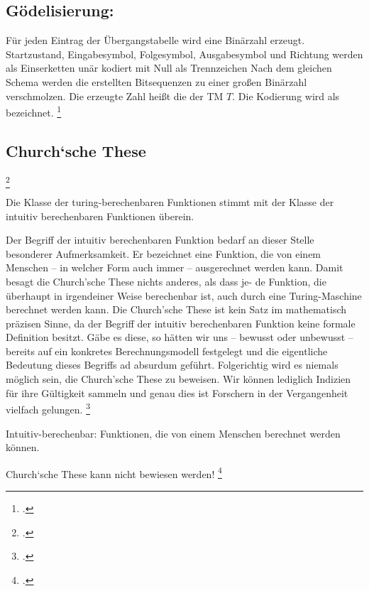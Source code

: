 \documentclass{lehramt-informatik-haupt}
\begin{document}
\subsection{Gödelisierung:}

Für jeden Eintrag der Übergangstabelle wird eine Binärzahl erzeugt.
Startzustand, Eingabesymbol, Folgesymbol, Ausgabesymbol und Richtung
werden als Einserketten unär kodiert mit Null als Trennzeichen Nach dem
gleichen Schema werden die erstellten Bitsequenzen zu einer großen
Binärzahl verschmolzen. Die erzeugte Zahl heißt die 
der TM $T$. Die Kodierung wird als  bezeichnet.
\footcite[Seite 23]{theo:fs:4}

\subsection{Church‘sche These}
\footcite{wiki:church-these}

Die Klasse der turing-berechenbaren Funktionen stimmt mit der
Klasse der intuitiv berechenbaren Funktionen überein.

Der Begriff der intuitiv berechenbaren Funktion bedarf an dieser Stelle
besonderer Aufmerksamkeit. Er bezeichnet eine Funktion, die von einem
Menschen – in welcher Form auch immer – ausgerechnet werden kann. Damit
besagt die Church’sche These nichts anderes, als dass je- de Funktion,
die überhaupt in irgendeiner Weise berechenbar ist, auch durch eine
Turing-Maschine berechnet werden kann. Die Church’sche These ist kein
Satz im mathematisch präzisen Sinne, da der Begriff der intuitiv
berechenbaren Funktion keine formale Definition besitzt. Gäbe es
diese, so hätten wir uns – bewusst oder unbewusst – bereits auf ein
konkretes Berechnungsmodell festgelegt und die eigentliche Bedeutung
dieses Begriffs ad absurdum geführt. Folgerichtig wird es niemals
möglich sein, die Church’sche These zu beweisen. Wir können lediglich
Indizien für ihre Gültigkeit sammeln und genau dies ist Forschern in der
Vergangenheit vielfach gelungen.
\footcite[Seite 308]{hoffmann}

Intuitiv-berechenbar:
Funktionen, die von einem Menschen berechnet werden können.

Church‘sche These kann nicht bewiesen werden!
\footcite[Seite 27]{theo:fs:4}
\literatur
\end{document}

